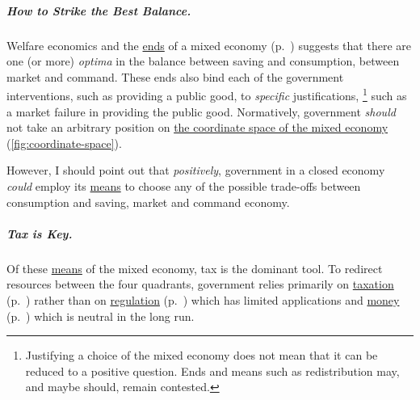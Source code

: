 \subparagraph[Optima]{How to Strike the Best Balance.} Welfare economics and the \hyperref[sec:ends]{ends} of a mixed economy (p.~\pageref{sec:ends}) suggests that there are one (or more) \emph{optima} in the balance between saving and consumption, between market and command.
These ends also bind each of the government interventions, such as providing a public good, to \emph{specific} justifications,
\footnote{
	Justifying a choice of the mixed economy does not mean that it can be reduced to a positive question.
	Ends and means such as redistribution may, and maybe should, remain contested.
}
such as a market failure in providing the public good.
Normatively, government \emph{should} not take an arbitrary position on \hyperref[fig:coordinate-space]{the coordinate space of the mixed economy} (\autoref{fig:coordinate-space}).

However, I should point out that \emph{positively}, government in a closed economy \emph{could} employ its \hyperref[sec:means]{means} to choose any of the possible trade-offs between consumption and saving, market and command economy.

\subparagraph[Tax is Key]{Tax is Key.} Of these \hyperref[sec:means]{means} of the mixed economy, tax is the dominant tool.
To redirect resources between the four quadrants, government relies primarily on \hyperref[sec:fiscal]{taxation} (p.~\pageref{sec:fiscal}) rather than on \hyperref[sec:regulatory]{regulation} (p.~\pageref{sec:regulatory}) which has limited applications and \hyperref[sec:monetary]{money} (p.~\pageref{sec:monetary}) which is neutral in the long run.

